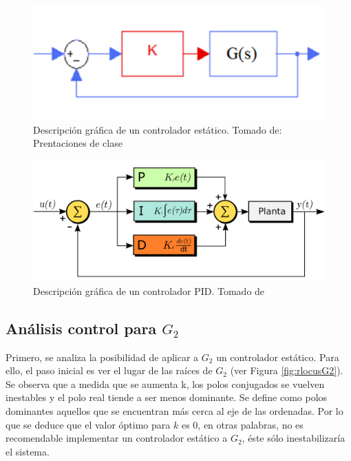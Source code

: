 \documentclass[journal]{IEEEtran}
\begin{document}
\begin{figure}[h!]
\caption{Descripción gráfica de un controlador estático. Tomado de: Prentaciones de clase\label{fig:estatico}}
  \centering
\includegraphics[scale=0.55]{control/Capture.PNG}
\end{figure}

\begin{figure}[h!]
\caption{Descripción gráfica de un controlador PID. Tomado de \cite{wiki:PID}\label{fig:PID}}
  \centering
\includegraphics[scale=0.12]{control/Controlador_pid_svg.png}
\end{figure}

\subsection{Análisis control para $G_2$}
Primero, se analiza la posibilidad de aplicar a $G_2$ un controlador estático. Para ello, el paso inicial es ver el lugar de las raíces de $G_2$ (ver Figura \ref{fig:rlocusG2}). Se observa que a medida que se aumenta k, los polos conjugados se  vuelven inestables y el polo real tiende a ser menos dominante. Se define como polos dominantes aquellos que se encuentran más cerca al eje de las ordenadas. Por lo que se deduce que el valor óptimo para $k$ es 0, en otras palabras, no es recomendable implementar un controlador estático a $G_2$, éste sólo inestabilizaría el sistema.\\
\end{document}
